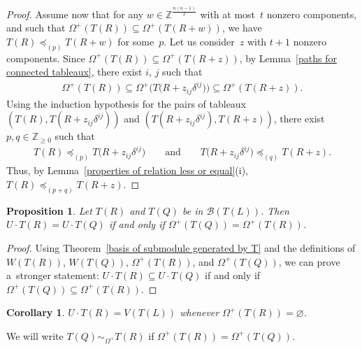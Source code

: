 \documentclass[11pt]{article}
\numberwithin{equation}{section}
\newtheorem{Corollary}[Theorem]{Corollary}
\newtheorem{Proposition}[Theorem]{Proposition}
{ \theoremstyle{definition}
\newtheorem{Definition}[Theorem]{Definition}
\newtheorem{Note}[Theorem]{Note}
\newtheorem{Example}[Theorem]{Example}
\newtheorem{Notation}[Theorem]{Notation}
\newtheorem{Remark}[Theorem]{Remark} }
\begin{document}
\begin{proof}
Assume now that for any $w\in\mathbb{Z}^{\frac{n(n-1)}{2}}$ with at most~$t$ nonzero components, and such that
$\Omega^{+}(T(R))\subseteq\Omega^{+}(T(R+w))$, we have $T(R)\preceq_{(p)} T(R+w)$ for some~$p$.
Let us consider~$z$ with $t+1$ nonzero components.
Since $\Omega^{+}(T(R))\subseteq \Omega^{+}(T(R+z))$, by Lemma~\ref{paths for connected tableaux}, there exist $i$, $j$
such that
\begin{gather*}
\Omega^{+}(T(R))\subseteq\Omega^{+}\big(T\big(R+z_{ij}\delta^{ij}\big)\big)\subseteq \Omega^{+}(T(R+z)).
\end{gather*}
Using the induction hypothesis for the pairs of tableaux $(T(R), T(R+z_{ij}\delta^{ij}))$ and
$(T(R+z_{ij}\delta^{ij}),T(R+z))$, there exist $p,q\in\mathbb{Z}_{\geq 0}$ such that
\begin{gather*}
T(R)\preceq_{(p)} T\big(R+z_{ij}\delta^{ij}\big)\qquad \text{and} \qquad T\big(R+z_{ij}\delta^{ij}\big)\preceq_{(q)} T(R+z).
\end{gather*}
Thus, by Lemma~\ref{properties of relation less or equal}(i), $T(R)\preceq_{(p+q)}T(R+z)$.
\end{proof}

\begin{Proposition}
\label{when two tableaux generate the same submodule}
Let $T(R)$ and $T(Q)$ be in $\mathcal{B}(T(L))$.
Then $U\cdot T(R)= U\cdot T(Q)$ if and only if $\Omega^{+}(T(Q))=\Omega^{+}(T(R))$.
\end{Proposition}
\begin{proof}\sloppy
Using Theorem~\ref{basis of submodule generated by T} and the def\/initions of $ W(T(R))$, $W(T(Q))$, $\Omega^{+}(T(R))$,
and $\Omega^{+}(T(Q))$, we can prove a~stronger statement: $U\cdot T(R) \subseteq U\cdot T(Q)$ if and only if
$\Omega^{+}(T(Q))\subseteq\Omega^{+}(T(R))$.
\end{proof}

\begin{Corollary}
$U \cdot T(R)=V(T(L))$ whenever $\Omega^{+}(T(R))=\varnothing$.
\end{Corollary}

\begin{Definition}
We will write $T(Q)\sim_{\Omega^+}T(R)$ if $\Omega^{+}(T(R)) = \Omega^{+}(T(Q))$.
\end{Definition}
\end{document}
